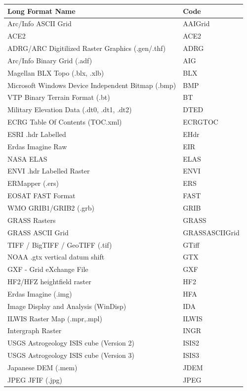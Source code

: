 \documentclass[
	12pt,
	a4paper,
	english,	
	appendixprefix,				     			        
	openany,		     	
	abstracton,		    		    
 	BCOR8mm,		    
]{scrartcl}
\begin{document}
\begin{longtable}{|p{9cm}|p{5cm}|}
\hline
Long Format Name&	Code\\
\hline
Arc/Info ASCII Grid&	AAIGrid\\
\hline
ACE2&	ACE2\\
\hline
ADRG/ARC Digitilized Raster Graphics (.gen/.thf)&	ADRG\\
\hline
Arc/Info Binary Grid (.adf)&	AIG\\
\hline
Magellan BLX Topo (.blx, .xlb)&	BLX\\
\hline
Microsoft Windows Device Independent Bitmap (.bmp)&	BMP\\
\hline
VTP Binary Terrain Format (.bt)&	BT\\
\hline
Military Elevation Data (.dt0, .dt1, .dt2)&	DTED\\
\hline
ECRG Table Of Contents (TOC.xml)&	ECRGTOC\\
\hline
ESRI .hdr Labelled&	EHdr\\
\hline
Erdas Imagine Raw&	EIR\\
\hline
NASA ELAS&	ELAS\\
\hline
ENVI .hdr Labelled Raster&	ENVI\\
\hline
ERMapper (.ers)&	ERS\\
\hline
EOSAT FAST Format&	FAST\\
\hline
WMO GRIB1/GRIB2 (.grb)&	GRIB\\
\hline
GRASS Rasters&	GRASS\\
\hline
GRASS ASCII Grid&	GRASSASCIIGrid\\
\hline
TIFF / BigTIFF / GeoTIFF (.tif)&	GTiff\\
\hline
NOAA .gtx vertical datum shift&	GTX\\
\hline
GXF - Grid eXchange File&	GXF\\
\hline
HF2/HFZ heightfield raster&	HF2\\
\hline
Erdas Imagine (.img)&	HFA\\
\hline
Image Display and Analysis (WinDisp)&	IDA\\
\hline
ILWIS Raster Map (.mpr,.mpl)&	ILWIS\\
\hline
Intergraph Raster&	INGR\\
\hline
USGS Astrogeology ISIS cube (Version 2)&	ISIS2\\
\hline
USGS Astrogeology ISIS cube (Version 3)&	ISIS3\\
\hline
Japanese DEM (.mem)&	JDEM\\
\hline
JPEG JFIF (.jpg)&	JPEG\\
\hline

\end{longtable}
\end{document}
